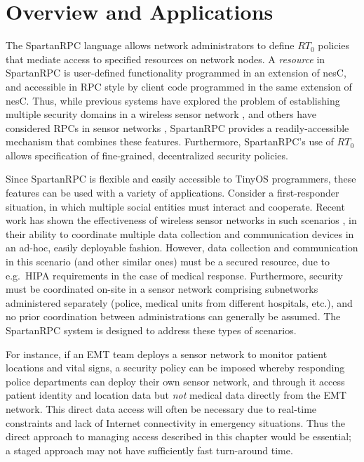\section{Overview and Applications}
\label{section-overview}

The SpartanRPC language allows network administrators to define $RT_0$ policies that mediate
access to specified resources on network nodes. A \emph{resource} in SpartanRPC is user-defined
functionality programmed in an extension of nesC, and accessible in RPC style by client code
programmed in the same extension of nesC. Thus, while previous systems have explored the problem
of establishing multiple security domains in a wireless sensor network
\cite{Claycomb:2011:NNL:1889383.1889450}, and others have considered RPCs in sensor networks
\cite{may-tinyrpc-2007,bergstrom-anycastrpc-2007,5766863}, SpartanRPC provides a
readily-accessible mechanism that combines these features. Furthermore, SpartanRPC's use of
$RT_0$ allows specification of fine-grained, decentralized security policies.

Since SpartanRPC is flexible and easily accessible to TinyOS programmers, these features can be
used with a variety of applications. Consider a first-responder situation, in which multiple
social entities must interact and cooperate. Recent work has shown the effectiveness of wireless
sensor networks in such scenarios \cite{citeulike:4460555,1038146}, in their ability to
coordinate multiple data collection and communication devices in an ad-hoc, easily deployable
fashion. However, data collection and communication in this scenario (and other similar ones)
must be a secured resource, due to e.g.~HIPA requirements in the case of medical response.
Furthermore, security must be coordinated on-site in a sensor network comprising subnetworks
administered separately (police, medical units from different hospitals, etc.), and no prior
coordination between administrations can generally be assumed. The SpartanRPC system is designed
to address these types of scenarios.

For instance, if an EMT team deploys a sensor network to monitor patient locations and vital
signs, a security policy can be imposed whereby responding police departments can deploy their
own sensor network, and through it access patient identity and location data but \emph{not}
medical data directly from the EMT network. This direct data access will often be necessary due
to real-time constraints and lack of Internet connectivity in emergency situations. Thus the
direct approach to managing access described in this chapter would be essential; a staged
approach may not have sufficiently fast turn-around time.

